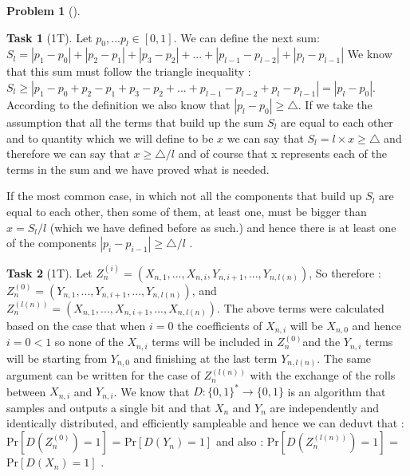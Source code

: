 \documentclass[11pt,twoside]{article}
\theoremstyle{definition}
\newtheorem{amsproblem}{Problem}
\newtheorem{amssubproblem}{Task}[amsproblem]
\newenvironment{problem}[1][]{%
  \begin{amsproblem}[#1]
  }{%
  \end{amsproblem}
}
\newenvironment{subproblem}[1][]{%
  \begin{amssubproblem}[#1]
  }{%
  \end{amssubproblem}
}
\newcommand{\TP}[1]{#1T}
\begin{document}
\begin{problem}
\begin{subproblem}[\TP{1}]
    Let $p_{0},...p_{l}\in [0,1]$. We can define the next sum:\newline $S_{l}=\left|p_{1}-p_{0}\right|+\left|p_{2}-p_{1}\right|+\left|p_{3}-p_{2}\right|+...+\left|p_{l-1}-p_{l-2}\right|+\left|p_{l}-p_{l-1}\right|$ \newline
    We know that this sum must follow the triangle inequality :\newline
    $S_{l}\geq \left|p_{1}-p_{0}+p_{2}-p_{1}+p_{3}-p_{2}+...+p_{l-1}-p_{l-2}+p_{l}-p_{l-1}\right|=\left| p_{l}-p_{0}\right|$.\newline
    According to the definition we also know that $\left| p_{l}-p_{0}\right|\geq \triangle$.\newline
    If we take the assumption that all the terms that build up the sum $S_{l}$ are equal to each other and to  quantity which we will define to be $x$ we can say that $S_{l}=l\times x\geq \triangle$ and therefore we can say that $x\geq\triangle/l$ and of course that x represents each of the terms in the sum and we have proved what is needed.\newline 
    
    If the most common case, in which not all the components that build up $S_{l}$ are equal to each other, then some of them, at least one, must be bigger than $x=S_{l}/l$ (which we have defined before as such.) and hence there is at least one of the components $\left|p_{i}-p_{i-1}\right|\geq\triangle/l$ .

  \end{subproblem}
  \begin{subproblem}[\TP{1}]
    Let \textit {$Z_{n}^{(i)}=(X_{n,1},...,X_{n,i},Y_{n,i+1},...,Y_{n,l(n)})$}, So therefore : \newline
    \textit {$Z_{n}^{(0)}=(Y_{n,1},...,Y_{n,i+1},...,Y_{n,l(n)})$}, and 
    \textit {$Z_{n}^{(l(n))}=(X_{n,1},...,X_{n,i+1},...,X_{n,l(n)})$}.\newline
    The above terms were calculated based on the case that when $i=0$ the coefficients of \textit{$X_{n,i}$} will be \textit{$X_{n,0}$} and hence $i=0<1$ so none of the \textit{$X_{n,i}$} terms will be included in \textit{$Z_{n}^{(0)}$}and the \textit{$Y_{n,i}$} terms will be starting from \textit{$Y_{n,0}$} and finishing at the last term \textit{$Y_{n,l(n)}$}. The same argument can be written for the case of \textit{$Z_{n}^{(l(n))}$} with the exchange of the rolls between \textit{$X_{n,i}$} and \textit{$Y_{n,i}$}.\newline 
    We know that \textit{$D:\{0,1\}^*\rightarrow \{0,1\}$} is an algorithm that samples and outputs a single bit and that \textit{$X_{n}$} and \textit{$Y_{n}$} are independently and identically distributed, and efficiently sampleable and hence we can deduvt that :\newline 
    Pr\textit{$[D(Z_{n}^{(0)})=1]$} = Pr\textit{$[D(Y_{n})=1]$} and also : \newline 
    Pr\textit{$[D(Z_{n}^{(l(n))})=1]$} = Pr\textit{$[D(X_{n})=1]$} .\newline 
    

\end{subproblem}
\end{problem}
\end{document}
